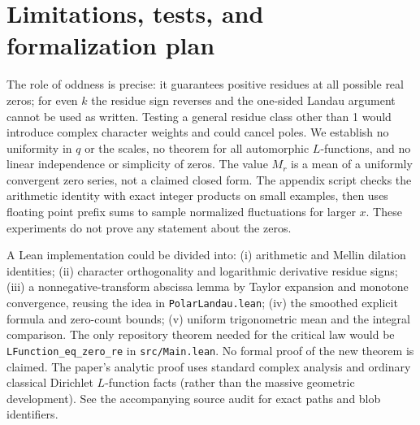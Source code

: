 \documentclass[11pt]{article}
\begin{document}
\section{Limitations, tests, and formalization plan}
The role of oddness is precise: it guarantees positive residues at all possible real zeros; for even $k$ the residue sign reverses and the one-sided Landau argument cannot be used as written. Testing a general residue class other than 1 would introduce complex character weights and could cancel poles. We establish no uniformity in $q$ or the scales, no theorem for all automorphic $L$-functions, and no linear independence or simplicity of zeros. The value $M_r$ is a mean of a uniformly convergent zero series, not a claimed closed form. The appendix script checks the arithmetic identity with exact integer products on small examples, then uses floating point prefix sums to sample normalized fluctuations for larger $x$. These experiments do not prove any statement about the zeros.

A Lean implementation could be divided into: (i) arithmetic and Mellin dilation identities; (ii) character orthogonality and logarithmic derivative residue signs; (iii) a nonnegative-transform abscissa lemma by Taylor expansion and monotone convergence, reusing the idea in \texttt{PolarLandau.lean}; (iv) the smoothed explicit formula and zero-count bounds; (v) uniform trigonometric mean and the integral comparison. The only repository theorem needed for the critical law would be \texttt{LFunction\_eq\_zero\_re} in \texttt{src/Main.lean}. No formal proof of the new theorem is claimed. The paper's analytic proof uses standard complex analysis and ordinary classical Dirichlet $L$-function facts (rather than the massive geometric development). See the accompanying source audit for exact paths and blob identifiers.
\end{document}

